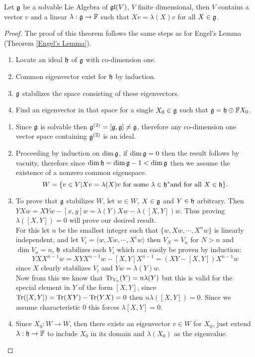\begin{teo}
	Let $\mathfrak{g}$ be a solvable Lie Algebra of $\mathfrak{gl}(V)$, $V$ finite dimensional, then $V$ contains a vector $v$ and a linear $\lambda:\mathfrak{g} \rightarrow \mathbb{F}$ such that $Xv = \lambda(X)v$ for all $X \in \mathfrak{g}$.
	\label{Lie's Theorem}
\end{teo}
\begin{proof}
	The proof of this theorem follows the same steps as for Engel's Lemma (Theorem \ref{Engel's Lemma}).
	\begin{enumerate}
		\item Locate an ideal $\mathfrak{h}$ of $\mathfrak{g}$ with co-dimension one.
		\item Common eigenvector exist for $\mathfrak{h}$ by induction.
		\item $\mathfrak{g}$ stabilizes the space consisting of these eigenvectors.
		\item Find an eigenvector in that space for a single $X_0 \in \mathfrak{g}$ such that $\mathfrak{g} = \mathfrak{h} \oplus \mathbb{F} X_0$.
	\end{enumerate}
	\begin{enumerate}
		\item Since $\mathfrak{g}$ is solvable then $\mathfrak{g}^{(2)}=[\mathfrak{g},\mathfrak{g}]\not=\mathfrak{g}$, therefore any co-dimension one vector space  containing $\mathfrak{g}^{(2)}$ is an ideal.\\
		\item Proceeding by induction on $\dim \mathfrak{g}$, if $\dim \mathfrak{g}=0$ then the result follows by vacuity, therefore since $\dim \mathfrak{h} = \dim \mathfrak{g} - 1 < \dim \mathfrak{g}$ then we assume the existence of a nonzero common eigenspace. $$W = \{v \in V | Xv = \lambda(X)v \text{ for some } \lambda \in \mathfrak{h}^* \text{and for all }X \in \mathfrak{h}\}.$$
		\item To prove that $\mathfrak{g}$ stabilizes $W$, let $w \in W$, $X \in \mathfrak{g}$ and $Y \in \mathfrak{h}$ arbitrary. Then $YXw = XYw - [x,y]w = \lambda(Y)Xw - \lambda([X,Y])w$. Thus proving $\lambda([X,Y])=0$ will prove our desired result.\\
		For this let $n$ be the smallest integer such that $\{w,Xw,\cdots,X^nw\}$ is linearly independent, and let $V_i = \langle w, Xw , \cdots, X^i w\rangle$ then $V_{N} = V_n$ for $N>n$ and $\dim V_n = n$, $\mathfrak{h}$ stabilizes each $V_i$ which can easily be proven by induction:
		$$YXX^{n-1}w = XYX^{n-1}w - [X,Y]X^{n-1} = (XY - [X,Y])X^{n-1}w$$ since $X$ clearly stabilizes $V_i$ and $Yw = \lambda(Y)w$.\\
		Now from this we know that $\text{Tr}_{V_n}(Y)=n\lambda(Y)$ but this is valid for the special element in $Y$ of the form $[X,Y]$, since $\text{Tr}([X,Y])= \text{Tr}(XY)-\text{Tr}(YX)=0$ then $n\lambda([X,Y])=0$. Since we assume characteristic $0$ this forces $\lambda[X,Y]=0$.
		\item Since $X_0: W \rightarrow W$, then there exists an eigenvector $v \in W$ for $X_0$, just extend $\lambda: \mathfrak{h} \rightarrow \mathbb{F}$ to include $X_0$ in its domain and $\lambda(X_0)$ as the eigenvalue.
		\end{enumerate}
\end{proof}